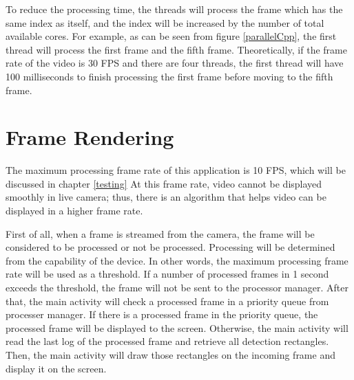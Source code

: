         To reduce the processing time,
        the threads will process the frame which has the same index as itself,
        and the index will be increased by the number of total available cores.
        For example, as can be seen from figure \ref{parallelCpp},
        the first thread will process the first frame and the fifth frame.
        Theoretically, if the frame rate of the video is 30 FPS and there are four threads,
        the first thread will have 100 milliseconds to finish processing the first frame before moving to the fifth frame.

    \section{Frame Rendering}
        The maximum processing frame rate of this application is 10 FPS, which will be discussed in chapter \ref{testing}
        At this frame rate, video cannot be displayed smoothly in live camera;
        thus, there is an algorithm that helps video can be displayed in a higher frame rate.

        First of all, when a frame is streamed from the camera,
        the frame will be considered to be processed or not be processed.
        Processing will be determined from the capability of the device.
        In other words, the maximum processing frame rate will be used as a threshold.
        If a number of processed frames in 1 second exceeds the threshold,
        the frame will not be sent to the processor manager.
        After that, the main activity will check a processed frame in a priority queue from processer manager.
        If there is a processed frame in the priority queue, the processed frame will be displayed to the screen.
        Otherwise, the main activity will read the last log of the processed frame and retrieve all detection rectangles.
        Then, the main activity will draw those rectangles on the incoming frame and display it on the screen.

